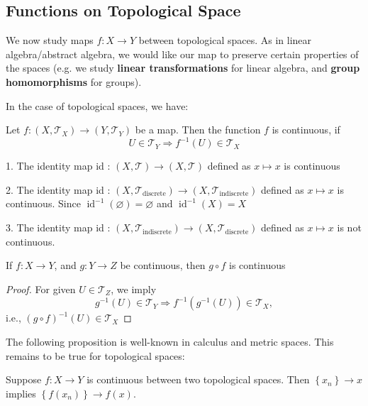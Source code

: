 \begin{example}
\section{Functions on Topological Space}
We now study maps $f:X \to Y$ between topological spaces. As in linear algebra/abstract algebra, we would like our map to preserve certain properties of the spaces (e.g. we study {\bf linear transformations} for linear algebra, and {\bf group homomorphisms} for groups). 

In the case of topological spaces, we have:
\begin{definition} Let \(f : \left({X,{\mathcal{T}}_X}\right)  \rightarrow  \left({Y,{\mathcal{T}}_Y}\right)\) be a map. Then the function \(f\) is continuous, if
\[
U \in  {\mathcal{T}}_Y \Rightarrow  {f}^{-1}\left(U\right)  \in  {\mathcal{T}}_X
\]
\end{definition}

\begin{example}
1. The identity map id : \(\left({X,\mathcal{T}}\right)  \rightarrow  \left({X,\mathcal{T}}\right)\) defined as \(x \mapsto  x\) is continuous

2. The identity map id : \(\left({X,{\mathcal{T}}_{\text{discrete}}}\right)  \rightarrow  \left({X,{\mathcal{T}}_{\text{indiscrete}}}\right)\) defined as \(x \mapsto  x\) is continuous. Since \({\operatorname{id}}^{-1}\left(\varnothing \right)  = \varnothing\) and \({\operatorname{id}}^{-1}\left(X\right)  = X\)

3. The identity map id : \(\left({X,{\mathcal{T}}_{\text{indiscrete}}}\right)  \rightarrow  \left({X,{\mathcal{T}}_{\text{discrete}}}\right)\) defined as \(x \mapsto  x\) is not continuous.
\end{example}

\begin{proposition} \label{prop:comp_cont_is_cont} If \(f : X \rightarrow  Y\), and \(g : Y \rightarrow  Z\) be continuous, then \(g \circ  f\) is continuous
\end{proposition}

\begin{proof} For given \(U \in  {\mathcal{T}}_{Z}\), we imply
\[
{g}^{-1}\left(U\right)  \in  {\mathcal{T}}_Y \Rightarrow  {f}^{-1}\left({{g}^{-1}\left(U\right)}\right)  \in  {\mathcal{T}}_X,
\]
i.e., \({\left(g \circ  f\right)}^{-1}\left(U\right)  \in  {\mathcal{T}}_X\)
\end{proof}

The following proposition is well-known in calculus and metric spaces. This remains to be true for topological spaces:
\begin{proposition} Suppose \(f : X \rightarrow  Y\) is continuous between two topological spaces. Then \(\left\{  x_n\right\}   \rightarrow  x\) implies \(\left\{  {f\left(x_n\right)}\right\}   \rightarrow  f\left(x\right)\).
\end{proposition}


\end{example}
